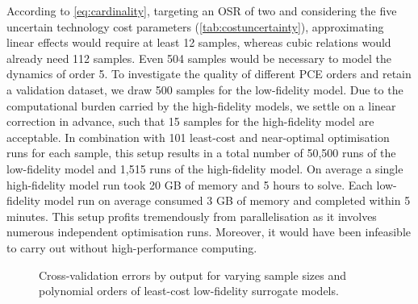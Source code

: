 According to \cref{eq:cardinality}, targeting an OSR of two
and considering the five uncertain technology cost parameters (\cref{tab:costuncertainty}),
approximating linear effects would require at least 12 samples, whereas cubic relations
would already need 112 samples. Even 504 samples would be necessary to model the dynamics of order 5.
To investigate the quality of different PCE orders
and retain a validation dataset,
we draw 500 samples for the low-fidelity model.
Due to the computational burden carried by the high-fidelity models,
we settle on a linear correction in advance, such that
15 samples for the high-fidelity model are acceptable.
In combination with 101 least-cost and near-optimal optimisation
runs for each sample, this setup results in a total number of
50,500 runs of the low-fidelity model and
1,515 runs of the high-fidelity model.
On average a single high-fidelity model run took 20 GB of memory and 5 hours to solve.
Each low-fidelity model run on average consumed 3 GB of memory and completed within 5 minutes.
This setup profits tremendously from parallelisation as it involves
numerous independent optimisation runs.
Moreover, it would have been infeasible to carry out without high-performance computing.


\begin{figure}
    \noindent{}
    \noindent{}
    \caption[Cross-validation errors]{Cross-validation errors by output for varying sample sizes and polynomial orders
    of least-cost low-fidelity surrogate models.}
    \label{fig:error}
\end{figure}


